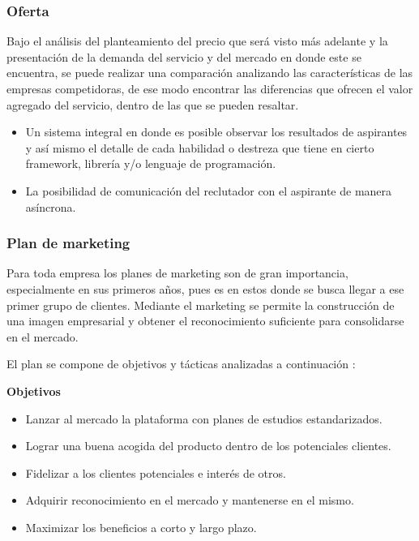 \subsubsection*{Oferta}

Bajo el análisis del planteamiento del precio que será visto más adelante y la presentación de la demanda del servicio y del mercado en donde este se encuentra, se puede realizar una comparación analizando las características de las empresas competidoras, de ese modo encontrar las diferencias que ofrecen el valor agregado del servicio, dentro de las que se pueden resaltar.

\begin{itemize}
    \item Un sistema integral en donde es posible observar los resultados de aspirantes y así mismo el detalle de cada habilidad o destreza que tiene en cierto framework, librería y/o lenguaje de programación. 
    
    \item La posibilidad de comunicación del reclutador con el aspirante de manera asíncrona.
    
\end{itemize}

\subsubsection*{Plan de marketing} 

Para toda empresa los planes de marketing son de gran importancia, especialmente en sus primeros años, pues es en estos donde se busca llegar a ese primer grupo de clientes. Mediante el marketing se permite la construcción de una imagen empresarial y obtener el reconocimiento suficiente para consolidarse en el mercado.

El plan se compone de objetivos y tácticas analizadas a continuación :

\textbf{Objetivos}
\begin{itemize}
    \begin{itemize}
    \item Lanzar al mercado la plataforma con planes de estudios estandarizados.
    \item Lograr una buena acogida del producto dentro de los potenciales clientes.
    \item Fidelizar a los clientes potenciales e interés de otros.
    \item Adquirir reconocimiento en el mercado y mantenerse en el mismo.
    \item Maximizar los beneficios a corto y largo plazo.
    \end{itemize}    
\end{itemize}


